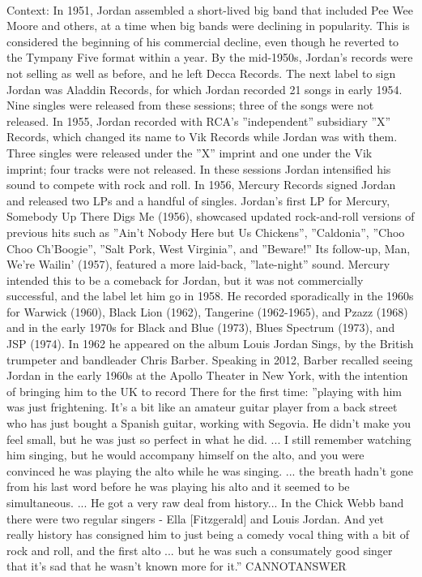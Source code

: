 \documentclass[11pt,a4paper, onecolumn]{article}
\begin{document}
\\ Context: In 1951, Jordan assembled a short-lived big band that included Pee Wee Moore and others, at a time when big bands were declining in popularity. This is considered the beginning of his commercial decline, even though he reverted to the Tympany Five format within a year. By the mid-1950s, Jordan's records were not selling as well as before, and he left Decca Records. The next label to sign Jordan was Aladdin Records, for which Jordan recorded 21 songs in early 1954. Nine singles were released from these sessions; three of the songs were not released. In 1955, Jordan recorded with RCA's ''independent'' subsidiary ''X'' Records, which changed its name to Vik Records while Jordan was with them. Three singles were released under the ''X'' imprint and one under the Vik imprint; four tracks were not released. In these sessions Jordan intensified his sound to compete with rock and roll. In 1956, Mercury Records signed Jordan and released two LPs and a handful of singles. Jordan's first LP for Mercury, Somebody Up There Digs Me (1956), showcased updated rock-and-roll versions of previous hits such as ''Ain't Nobody Here but Us Chickens'', ''Caldonia'', ''Choo Choo Ch'Boogie'', ''Salt Pork, West Virginia'', and ''Beware!'' Its follow-up, Man, We're Wailin' (1957), featured a more laid-back, ''late-night'' sound. Mercury intended this to be a comeback for Jordan, but it was not commercially successful, and the label let him go in 1958. He recorded sporadically in the 1960s for Warwick (1960), Black Lion (1962), Tangerine (1962-1965), and Pzazz (1968) and in the early 1970s for Black and Blue (1973), Blues Spectrum (1973), and JSP (1974). In 1962 he appeared on the album Louis Jordan Sings, by the British trumpeter and bandleader Chris Barber. Speaking in 2012, Barber recalled seeing Jordan in the early 1960s at the Apollo Theater in New York, with the intention of bringing him to the UK to record There for the first time: ''playing with him was just frightening. It's a bit like an amateur guitar player from a back street who has just bought a Spanish guitar, working with Segovia. He didn't make you feel small, but he was just so perfect in what he did. ... I still remember watching him singing, but he would accompany himself on the alto, and you were convinced he was playing the alto while he was singing. ... the breath hadn't gone from his last word before he was playing his alto and it seemed to be simultaneous. ... He got a very raw deal from history... In the Chick Webb band there were two regular singers - Ella [Fitzgerald] and Louis Jordan. And yet really history has consigned him to just being a comedy vocal thing with a bit of rock and roll, and the first alto ... but he was such a consumately good singer that it's sad that he wasn't known more for it.'' CANNOTANSWER
\end{document}
